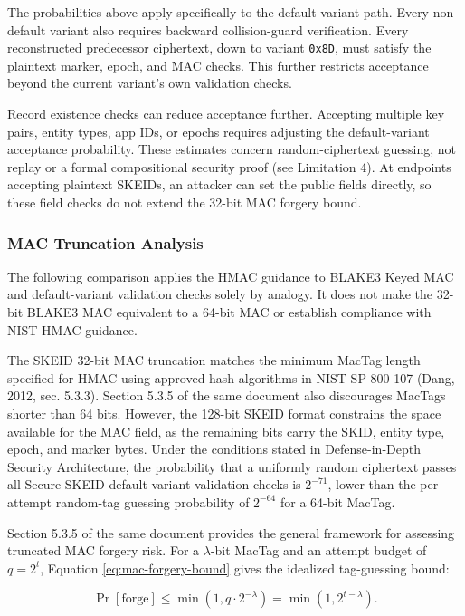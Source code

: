 \documentclass[fleqn,10pt]{wlpeerj}
\begin{document}
The probabilities above apply specifically to the default-variant path.
Every non-default variant also requires backward collision-guard
verification. Every reconstructed predecessor ciphertext, down to
variant \texttt{0x8D}, must satisfy the plaintext marker, epoch, and MAC
checks. This further restricts acceptance beyond the current variant's
own validation checks.

Record existence checks can reduce acceptance further. Accepting
multiple key pairs, entity types, app IDs, or epochs requires adjusting
the default-variant acceptance probability. These estimates concern
random-ciphertext guessing, not replay or a formal compositional
security proof (see Limitation 4). At endpoints accepting plaintext
SKEIDs, an attacker can set the public fields directly, so these field
checks do not extend the 32-bit MAC forgery bound.

\subsubsection{MAC Truncation Analysis}\label{mac-truncation-analysis}

The following comparison applies the HMAC guidance to BLAKE3 Keyed MAC
and default-variant validation checks solely by analogy. It does not
make the 32-bit BLAKE3 MAC equivalent to a 64-bit MAC or establish
compliance with NIST HMAC guidance.

The SKEID 32-bit MAC truncation matches the minimum MacTag length
specified for HMAC using approved hash algorithms in NIST SP 800-107
(Dang, 2012, sec. 5.3.3). Section 5.3.5 of the same document also
discourages MacTags shorter than 64 bits. However, the 128-bit SKEID
format constrains the space available for the MAC field, as the
remaining bits carry the SKID, entity type, epoch, and marker bytes.
Under the conditions stated in Defense-in-Depth Security Architecture,
the probability that a uniformly random ciphertext passes all Secure
SKEID default-variant validation checks is \(2^{-71}\), lower than the
per-attempt random-tag guessing probability of \(2^{-64}\) for a 64-bit
MacTag.

Section 5.3.5 of the same document provides the general framework for
assessing truncated MAC forgery risk. For a \(\lambda\)-bit MacTag and
an attempt budget of \(q = 2^t\), Equation \eqref{eq:mac-forgery-bound}
gives the idealized tag-guessing bound:

\begin{equation}
\label{eq:mac-forgery-bound}
\Pr[\mathrm{forge}] \leq \min(1, q \cdot 2^{-\lambda})
  = \min(1, 2^{t-\lambda}).
\end{equation}
\end{document}
